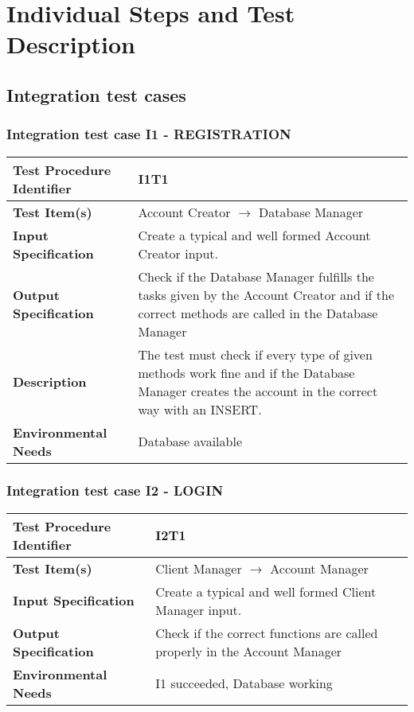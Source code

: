 \section{Individual Steps and Test Description}

\subsection{Integration test cases}
\subsubsection{Integration test case I1 - REGISTRATION} 
\hfill \newline
 \begin{tabular}{l p{}}
    \hline
    \textbf{Test Procedure Identifier} &  I1T1  \\
    \hline
    \textbf{Test Item(s)} & Account Creator  $\rightarrow$ Database Manager\\
    \hline
    \textbf{Input Specification} & Create a typical and well formed Account Creator input. \\
    \hline
    \textbf{Output Specification} & Check if the Database Manager fulfills the tasks given by the Account Creator and if the correct methods are called in the Database Manager \\
    \hline
    \textbf{Description} &   The test must check if every type of given methods work fine and if the Database Manager creates the account in the correct way with an INSERT. \\
    \hline
    \textbf{Environmental Needs} & Database available \\
    \hline
    
    \end{tabular}



\hfill \newline \newline 
\subsubsection{Integration test case I2 - LOGIN}
 \begin{tabular}{l p{}}
    \hline
    \textbf{Test Procedure Identifier} &  I2T1 \\
    \hline
    \textbf{Test Item(s)} & Client Manager  $\rightarrow$ Account Manager \\
    \hline
    \textbf{Input Specification} &  Create a typical and well formed Client Manager input.   \\
    \hline
    \textbf{Output Specification} & Check if the correct functions are called properly in the Account Manager\\
    \hline
    \textbf{Environmental Needs} & I1 succeeded, Database working \\
    \hline
\end{tabular}


